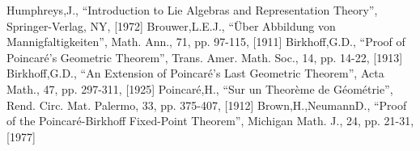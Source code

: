 \documentclass[aps,twocolumn,secnumarabic,nobalancelastpage,amsmath,amssymb,
amsthm,nofootinbib,parskip=full]{revtex4}
\numberwithin{equation}{section}
\begin{document}
\begin{thebibliography}{99}
Humphreys,J., ``Introduction to Lie Algebras and Representation Theory'', Springer-Verlag, NY, [1972]
Brouwer,L.E.J., ``\"Uber Abbildung von Mannigfaltigkeiten'', Math. Ann., 71, pp. 97-115, [1911]
Birkhoff,G.D., ``Proof of Poincar\'e's Geometric Theorem'', Trans. Amer. Math. Soc., 14, pp. 14-22, [1913]
Birkhoff,G.D., ``An Extension of Poincar\'e's Last Geometric Theorem'', Acta Math., 47, pp. 297-311, [1925]
Poincar\'e,H., ``Sur un Theor\`eme de G\'eom\'etrie'', Rend. Circ. Mat. Palermo, 33, pp. 375-407, [1912]
Brown,H.,NeumannD., ``Proof of the Poincar\'e-Birkhoff Fixed-Point Theorem'', Michigan Math. J., 24, pp. 21-31, [1977]

\end{thebibliography}
\end{document}
